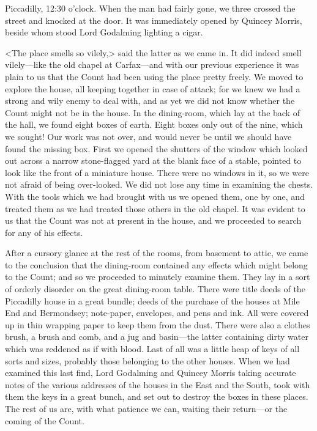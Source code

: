 \begin{diary}{Piccadilly, 12:30 o'clock.}
When the man had fairly gone, we three crossed the street and knocked at the door. It was immediately opened by Quincey Morris, beside whom stood Lord Godalming lighting a cigar.

<The place smells so vilely,> said the latter as we came in. It did indeed smell vilely—like the old chapel at Carfax—and with our previous experience it was plain to us that the Count had been using the place pretty freely. We moved to explore the house, all keeping together in case of attack; for we knew we had a strong and wily enemy to deal with, and as yet we did not know whether the Count might not be in the house. In the dining-room, which lay at the back of the hall, we found eight boxes of earth. Eight boxes only out of the nine, which we sought! Our work was not over, and would never be until we should have found the missing box. First we opened the shutters of the window which looked out across a narrow stone-flagged yard at the blank face of a stable, pointed to look like the front of a miniature house. There were no windows in it, so we were not afraid of being over-looked. We did not lose any time in examining the chests. With the tools which we had brought with us we opened them, one by one, and treated them as we had treated those others in the old chapel. It was evident to us that the Count was not at present in the house, and we proceeded to search for any of his effects.

After a cursory glance at the rest of the rooms, from basement to attic, we came to the conclusion that the dining-room contained any effects which might belong to the Count; and so we proceeded to minutely examine them. They lay in a sort of orderly disorder on the great dining-room table. There were title deeds of the Piccadilly house in a great bundle; deeds of the purchase of the houses at Mile End and Bermondsey; note-paper, envelopes, and pens and ink. All were covered up in thin wrapping paper to keep them from the dust. There were also a clothes brush, a brush and comb, and a jug and basin—the latter containing dirty water which was reddened as if with blood. Last of all was a little heap of keys of all sorts and sizes, probably those belonging to the other houses. When we had examined this last find, Lord Godalming and Quincey Morris taking accurate notes of the various addresses of the houses in the East and the South, took with them the keys in a great bunch, and set out to destroy the boxes in these places. The rest of us are, with what patience we can, waiting their return—or the coming of the Count.
\end{diary}